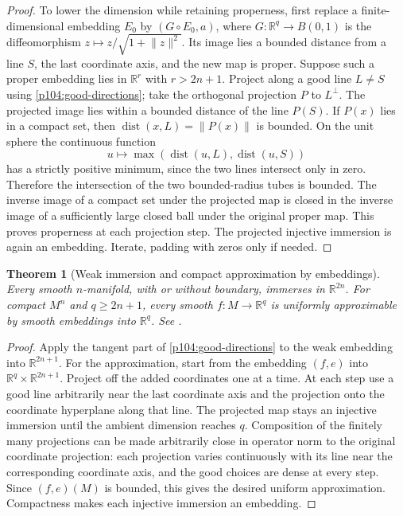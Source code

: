 \documentclass[11pt,oneside,openany]{book}
\newtheorem{theorem}{Theorem}[chapter]
\theoremstyle{definition}
\theoremstyle{remark}
\newcommand{\R}{\mathbb R}
\begin{document}
\begin{proof}
To lower the dimension while retaining properness, first replace a finite-dimensional embedding \(E_0\) by \((G\circ E_0,a)\), where \(G:\R^q\to B(0,1)\) is the diffeomorphism \(z\mapsto z/\sqrt{1+\lVert z\rVert^2}\). Its image lies a bounded distance from a line \(S\), the last coordinate axis, and the new map is proper. Suppose such a proper embedding lies in \(\R^r\) with \(r>2n+1\). Project along a good line \(L\ne S\) using \cref{p104:good-directions}; take the orthogonal projection \(P\) to \(L^\perp\). The projected image lies within a bounded distance of the line \(P(S)\). If \(P(x)\) lies in a compact set, then \(\operatorname{dist}(x,L)=\lVert P(x)\rVert\) is bounded. On the unit sphere the continuous function
\[
 u\longmapsto \max(\operatorname{dist}(u,L),\operatorname{dist}(u,S))
\]
has a strictly positive minimum, since the two lines intersect only in zero. Therefore the intersection of the two bounded-radius tubes is bounded. The inverse image of a compact set under the projected map is closed in the inverse image of a sufficiently large closed ball under the original proper map. This proves properness at each projection step. The projected injective immersion is again an embedding. Iterate, padding with zeros only if needed.
\end{proof}

\begin{theorem}[Weak immersion and compact approximation by embeddings]\label{p104:M04.03}
Every smooth \(n\)-manifold, with or without boundary, immerses in \(\R^{2n}\). For compact \(M^n\) and \(q\geq 2n+1\), every smooth \(f:M\to\R^q\) is uniformly approximable by smooth embeddings into \(\R^q\). See \cite[Corollary 6.17 and Theorem 6.18]{lee}.
\end{theorem}
\begin{proof}
Apply the tangent part of \cref{p104:good-directions} to the weak embedding into \(\R^{2n+1}\). For the approximation, start from the embedding \((f,e)\) into \(\R^q\times\R^{2n+1}\). Project off the added coordinates one at a time. At each step use a good line arbitrarily near the last coordinate axis and the projection onto the coordinate hyperplane along that line. The projected map stays an injective immersion until the ambient dimension reaches \(q\). Composition of the finitely many projections can be made arbitrarily close in operator norm to the original coordinate projection: each projection varies continuously with its line near the corresponding coordinate axis, and the good choices are dense at every step. Since \((f,e)(M)\) is bounded, this gives the desired uniform approximation. Compactness makes each injective immersion an embedding.
\end{proof}
\end{document}
